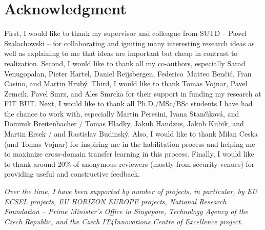 
\section*{Acknowledgment}
First, I would like to thank my supervisor and colleague from SUTD -- Pawel Szalachowski -- for collaborating and igniting many interesting research ideas as well as explaining to me that ideas are important but cheap in contrast to realization. 
Second, I would like to thank all my co-authors, especially Sarad Venugopalan, Pieter Hartel, Daniel Reijsbergen, Federico~Matteo Ben{\v{c}}i{\'c}, Fran Casino, and Martin Hrub{\'y}. 
%
Third, I would like to thank Tomas Vojnar, Pavel Zemcik, Pavel Smrz, and Ales Smrcka for their support in funding my research at FIT BUT.
Next, I would like to thank all Ph.D./MSc/BSc students I have had the chance to work with, especially Martin Peresini, Ivana Stan{\v{c}}{\'\i}kov{\'a}, and Dominik Breitenbacher / Tomas Hladky, Jakub Handzus, Jakub Kubik, and Martin Ersek / and Rastislav Budinsk{\'y}. 
%
Also, I would like to thank Milan Ceska (and Tomas Vojnar) for inspiring me in the habilitation process and helping me to maximize cross-domain transfer learning in this process.  
Finally, I would like to thank around 20\% of anonymous reviewers (mostly from security venues) for providing useful and constructive feedback. %






\vfill \emph{Over the time, I have been supported by number of projects, in particular, by EU ECSEL projects, EU HORIZON EUROPE projects, National Research Foundation -- Prime Minister's Office in Singapore, Technology Agency of the Czech Republic, and the Czech IT4Innovations Centre of Excellence project.
}
